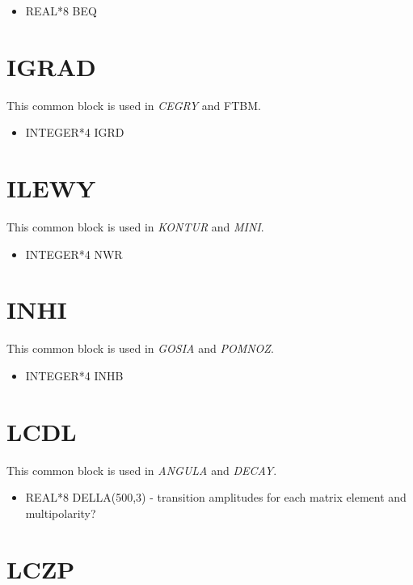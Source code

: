 \begin{itemize}
\item REAL*8 BEQ
\end{itemize}

\section{IGRAD}

This common block is used in {\em CEGRY} and {FTBM}.

\begin{itemize}
\item INTEGER*4 IGRD
\end{itemize}

\section{ILEWY}

This common block is used in {\em KONTUR} and {\em MINI}.

\begin{itemize}
\item INTEGER*4 NWR
\end{itemize}

\section{INHI}

This common block is used in {\em GOSIA} and {\em POMNOZ}.

\begin{itemize}
\item INTEGER*4 INHB
\end{itemize}


\section{LCDL}

This common block is used in {\em ANGULA} and {\em DECAY}.

\begin{itemize}
\item REAL*8 DELLA(500,3) - transition amplitudes for each matrix element
and multipolarity?
\end{itemize}

\section{LCZP}

